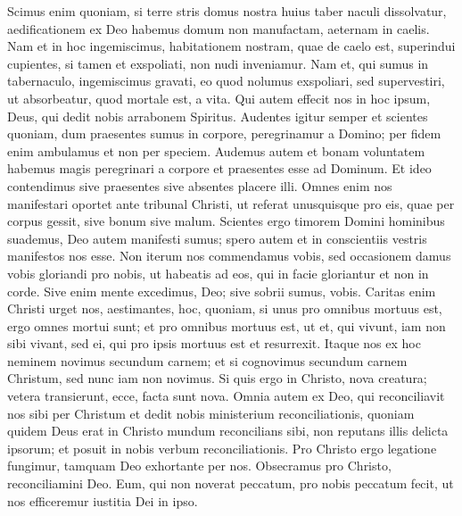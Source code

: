 \begin{biblechapter}
\begin{biblechapter}
\begin{biblechapter}
\begin{biblechapter}
\begin{biblechapter}
\verse Scimus enim quoniam, si terre stris domus nostra huius taber naculi dissolvatur, aedificationem ex Deo habemus domum non manufactam, aeternam in caelis. 
\verse Nam et in hoc ingemiscimus, habitationem nostram, quae de caelo est, superindui cupientes, 
\verse si tamen et exspoliati, non nudi inveniamur.
 \verse Nam et, qui sumus in tabernaculo, ingemiscimus gravati, eo quod nolumus exspoliari, sed supervestiri, ut absorbeatur, quod mortale est, a vita. 
\verse Qui autem effecit nos in hoc ipsum, Deus, qui dedit nobis arrabonem Spiritus.
 \verse Audentes igitur semper et scientes quoniam, dum praesentes sumus in corpore, peregrinamur a Domino; 
\verse per fidem enim ambulamus et non per speciem. 
\verse Audemus autem et bonam voluntatem habemus magis peregrinari a corpore et praesentes esse ad Dominum. 
\verse Et ideo contendimus sive praesentes sive absentes placere illi. 
\verse Omnes enim nos manifestari oportet ante tribunal Christi, ut referat unusquisque pro eis, quae per corpus gessit, sive bonum sive malum.
 \verse Scientes ergo timorem Domini hominibus suademus, Deo autem manifesti sumus; spero autem et in conscientiis vestris manifestos nos esse. 
\verse Non iterum nos commendamus vobis, sed occasionem damus vobis gloriandi pro nobis, ut habeatis ad eos, qui in facie gloriantur et non in corde. 
\verse Sive enim mente excedimus, Deo; sive sobrii sumus, vobis.
 \verse Caritas enim Christi urget nos, aestimantes, hoc, quoniam, si unus pro omnibus mortuus est, ergo omnes mortui sunt; 
\verse et pro omnibus mortuus est, ut et, qui vivunt, iam non sibi vivant, sed ei, qui pro ipsis mortuus est et resurrexit. 
\verse Itaque nos ex hoc neminem novimus secundum carnem; et si cognovimus secundum carnem Christum, sed nunc iam non novimus. 
\verse Si quis ergo in Christo, nova creatura; vetera transierunt, ecce, facta sunt nova.
 \verse Omnia autem ex Deo, qui reconciliavit nos sibi per Christum et dedit nobis ministerium reconciliationis, 
\verse quoniam quidem Deus erat in Christo mundum reconcilians sibi, non reputans illis delicta ipsorum; et posuit in nobis verbum reconciliationis. 
\verse Pro Christo ergo legatione fungimur, tamquam Deo exhortante per nos. Obsecramus pro Christo, reconciliamini Deo. 
\verse Eum, qui non noverat peccatum, pro nobis peccatum fecit, ut nos efficeremur iustitia Dei in ipso.
 

\end{biblechapter}
\end{biblechapter}
\end{biblechapter}
\end{biblechapter}
\end{biblechapter}

